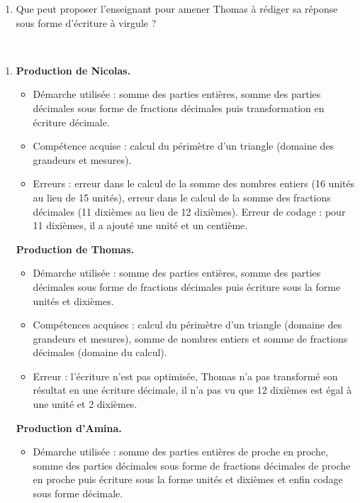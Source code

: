{\begin{exercice}[CRPE 2018 G1]
\begin{enumerate}
\begin{center}
   \end{center}
   \item Que peut proposer l’enseignant pour amener Thomas à rédiger sa réponse sous forme d’écriture à virgule ?
\end{enumerate}
\end{exercice}

\begin{corrige}
\ \\ [-5mm]
\begin{enumerate}
   \item {\bf Production de Nicolas.}
   \begin{itemize}
      \item Démarche utilisée : somme des parties entières, somme des parties décimales sous forme de fractions décimales puis transformation en écriture décimale.
      \item Compétence acquise : calcul du périmètre d'un triangle (domaine des grandeurs et mesures).
      \item Erreurs : erreur dans le calcul de la somme des nombres entiers (16 unités au lieu de 15 unités), erreur dans le calcul de la somme des fractions décimales (11 dixièmes au lieu de 12 dixièmes). Erreur de codage : pour 11 dixièmes, il a ajouté une unité et un centième.
   \end{itemize} 
   \smallskip
    {\bf Production de Thomas.}
   \begin{itemize}
       \item Démarche utilisée : somme des parties entières, somme des parties décimales sous forme de fractions décimales puis écriture sous la forme unités et dixièmes.
      \item Compétences acquises : calcul du périmètre d'un triangle (domaine des grandeurs et mesures), somme de nombres entiers et somme de fractions décimales (domaine du calcul).
      \item Erreur : l'écriture n'est pas optimisée, Thomas n'a pas transformé son résultat en une écriture décimale, il n'a pas \og vu \fg{} que 12 dixièmes est égal à une unité et 2 dixièmes.
   \end{itemize}
   \smallskip
   {\bf Production d'Amina.}
   \begin{itemize}
       \item Démarche utilisée : somme des parties entières de proche en proche, somme des parties décimales sous forme de fractions décimales de proche en proche puis écriture sous la forme unités et dixièmes et enfin codage sous forme décimale.

\end{itemize}
\end{enumerate}
\end{corrige}}
